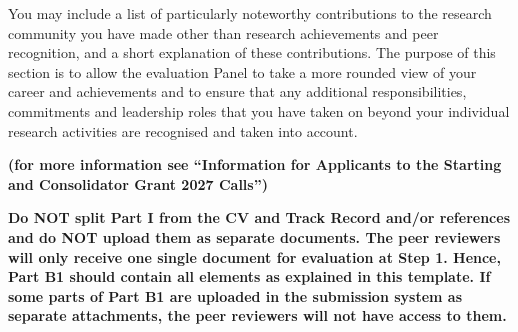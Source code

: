 \documentclass[timesnewroman,partone,draftproposal]{erc-stg}
\begin{document}
\begin{erccomment}
You may include a list of particularly noteworthy contributions to the
research community you have made other than research achievements and peer
recognition, and a short explanation of these contributions. The purpose of this
section is to allow the evaluation Panel to take a more rounded view of your career and
achievements and to ensure that any additional responsibilities, commitments
and leadership roles that you have taken on beyond your individual research
activities are recognised and taken into account.

\textbf{(for more information see ``Information for Applicants to the
Starting and Consolidator Grant 2027 Calls'')}

\textbf{Do NOT split Part I from the CV and Track Record and/or references and do NOT
upload them as separate documents. The peer reviewers will only receive one single
document for evaluation at Step 1. Hence, Part B1 should contain all elements as
explained in this template. If some parts of Part B1 are uploaded in the submission
system as separate attachments, the peer reviewers will not have access to them.}
\end{erccomment}
\end{document}
